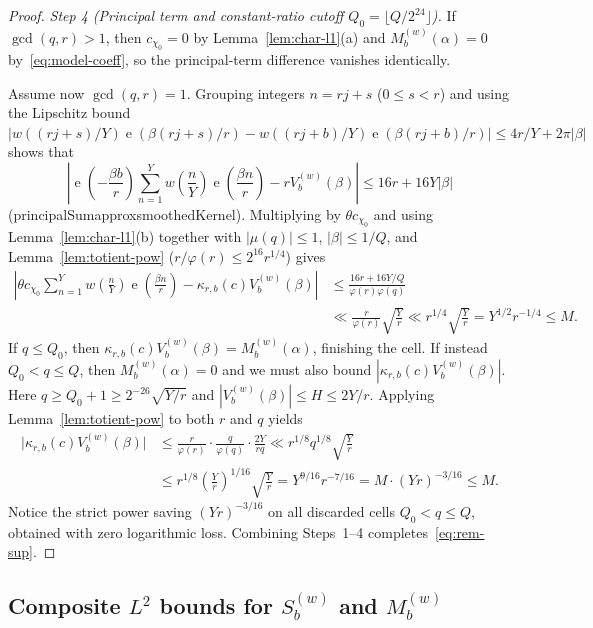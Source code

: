 \documentclass[11pt,reqno]{amsart}
\numberwithin{equation}{section}
\theoremstyle{definition}
\newcommand{\1}{\mathbf{1}}
\newcommand{\e}{\operatorname{e}}
\newcommand{\lean}[1]{{\footnotesize\ttfamily\renewcommand{\_}{\textunderscore\allowbreak}#1}}
\begin{document}
\begin{proof}
\emph{Step 4 (Principal term and constant-ratio cutoff $Q_0 = \lfloor Q/2^{24}\rfloor$).}
If $\gcd(q, r) > 1$, then $c_{\chi_0} = 0$ by Lemma~\ref{lem:char-l1}(a) and $M_b^{(w)}(\alpha) = 0$ by~\eqref{eq:model-coeff}, so the principal-term difference vanishes identically.

Assume now $\gcd(q, r) = 1$. Grouping integers $n = r j + s$ ($0 \le s < r$) and using the Lipschitz bound $|w((rj+s)/Y)\e(\beta(rj+s)/r) - w((rj+b)/Y)\e(\beta(rj+b)/r)| \le 4r/Y + 2\pi|\beta|$ shows that
\[
  \left|\e\!\left(-\frac{\beta b}{r}\right)\sum_{n=1}^Y w\!\left(\frac{n}{Y}\right)\e\!\left(\frac{\beta n}{r}\right) - r V_b^{(w)}(\beta)\right|
  \le 16 r + 16 Y |\beta|
\]
(\lean{principalSum\_approx\_smoothedKernel}). Multiplying by $\theta c_{\chi_0}$ and using Lemma~\ref{lem:char-l1}(b) together with $|\mu(q)| \le 1$, $|\beta| \le 1/Q$, and Lemma~\ref{lem:totient-pow} ($r/\varphi(r) \le 2^{16} r^{1/4}$) gives
\begin{align*}
  \left|\theta c_{\chi_0} \sum_{n=1}^Y w\!\left(\frac{n}{Y}\right)\e\!\left(\frac{\beta n}{r}\right) - \kappa_{r,b}(c) V_b^{(w)}(\beta)\right|
  &\le \frac{16 r + 16 Y/Q}{\varphi(r)\varphi(q)} \\
  &\ll \frac{r}{\varphi(r)} \sqrt{\frac{Y}{r}}
  \ll r^{1/4} \sqrt{\frac{Y}{r}} = Y^{1/2} r^{-1/4} \le M.
\end{align*}
If $q \le Q_0$, then $\kappa_{r,b}(c) V_b^{(w)}(\beta) = M_b^{(w)}(\alpha)$, finishing the cell. If instead $Q_0 < q \le Q$, then $M_b^{(w)}(\alpha) = 0$ and we must also bound $|\kappa_{r,b}(c) V_b^{(w)}(\beta)|$. Here $q \ge Q_0 + 1 \ge 2^{-26}\sqrt{Y/r}$ and $|V_b^{(w)}(\beta)| \le H \le 2Y/r$. Applying Lemma~\ref{lem:totient-pow} to both $r$ and $q$ yields
\begin{align*}
  \bigl|\kappa_{r,b}(c) V_b^{(w)}(\beta)\bigr|
  &\le \frac{r}{\varphi(r)}\cdot \frac{q}{\varphi(q)} \cdot \frac{2 Y}{r q}
   \ll r^{1/8} q^{1/8} \sqrt{\frac{Y}{r}} \\
  &\le r^{1/8}\left(\frac{Y}{r}\right)^{1/16}\sqrt{\frac{Y}{r}}
   = Y^{9/16} r^{-7/16}
   = M \cdot (Y r)^{-3/16}
   \le M.
\end{align*}
Notice the strict power saving $(Yr)^{-3/16}$ on all discarded cells $Q_0 < q \le Q$, obtained with zero logarithmic loss. Combining Steps~1--4 completes~\eqref{eq:rem-sup}.
\end{proof}

\subsection{Composite \texorpdfstring{$L^2$}{L2} bounds for \texorpdfstring{$S_b^{(w)}$}{Sb} and \texorpdfstring{$M_b^{(w)}$}{Mb}}
\end{document}
